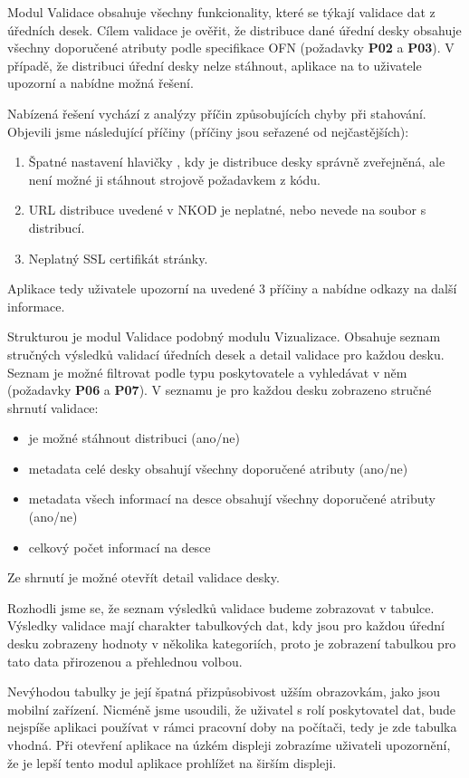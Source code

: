 Modul Validace obsahuje všechny funkcionality, které se týkají validace dat z úředních desek. Cílem validace je ověřit, že distribuce dané úřední desky obsahuje všechny doporučené atributy podle specifikace OFN (požadavky \textbf{P02} a \textbf{P03}). V případě, že distribuci úřední desky nelze stáhnout, aplikace na to uživatele upozorní a nabídne možná řešení.

Nabízená řešení vychází z analýzy příčin způsobujících chyby při stahování. Objevili jsme následující příčiny (příčiny jsou seřazené od nejčastějších):
\begin{enumerate}
    \item Špatné nastavení hlavičky , kdy je distribuce desky správně zveřejněná, ale není možné ji stáhnout strojově požadavkem z kódu.
    \item URL distribuce uvedené v NKOD je neplatné, nebo nevede na soubor s distribucí.
    \item Neplatný SSL certifikát stránky.
\end{enumerate}
Aplikace tedy uživatele upozorní na uvedené 3 příčiny a nabídne odkazy na další informace.

Strukturou je modul Validace podobný modulu Vizualizace. Obsahuje seznam stručných výsledků validací úředních desek a detail validace pro každou desku. Seznam je možné filtrovat podle typu poskytovatele a vyhledávat v něm (požadavky \textbf{P06} a \textbf{P07}).  V seznamu je pro každou desku zobrazeno stručné shrnutí validace:
\begin{itemize}
    \item je možné stáhnout distribuci (ano/ne)
    \item metadata celé desky obsahují všechny doporučené atributy (ano/ne)
    \item metadata všech informací na desce obsahují všechny doporučené atributy (ano/ne)
    \item celkový počet informací na desce
\end{itemize}
Ze shrnutí je možné otevřít detail validace desky.

Rozhodli jsme se, že seznam výsledků validace budeme zobrazovat v tabulce. Výsledky validace mají charakter tabulkových dat, kdy jsou pro každou úřední desku zobrazeny hodnoty v několika kategoriích, proto je zobrazení tabulkou pro tato data přirozenou a přehlednou volbou. 

Nevýhodou tabulky je její špatná přizpůsobivost užším obrazovkám, jako jsou mobilní zařízení. Nicméně jsme usoudili, že uživatel s rolí poskytovatel dat, bude nejspíše aplikaci používat v rámci pracovní doby na počítači, tedy je zde tabulka vhodná. Při otevření aplikace na úzkém displeji zobrazíme uživateli upozornění, že je lepší tento modul aplikace prohlížet na širším displeji.

